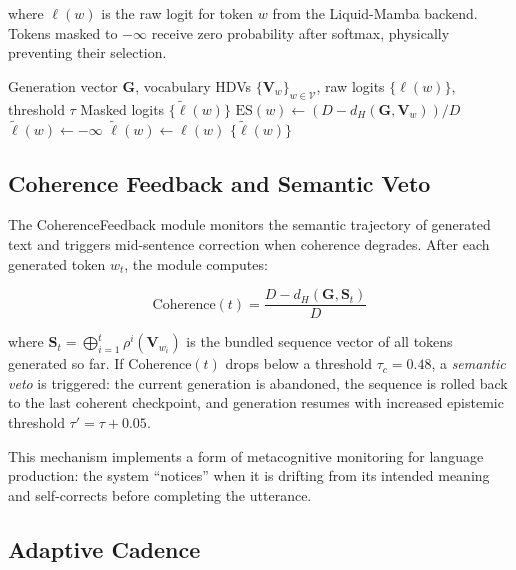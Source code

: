 \documentclass[12pt,a4paper]{article}
\begin{document}
where $\ell(w)$ is the raw logit for token $w$ from the Liquid-Mamba backend. Tokens masked to $-\infty$ receive zero probability after softmax, physically preventing their selection.

\begin{algorithm}[H]
\caption{Epistemic Gating for Token Generation}
\label{alg:epistemic-gate}
\begin{algorithmic}[1]
\REQUIRE Generation vector $\mathbf{G}$, vocabulary HDVs $\{\mathbf{V}_w\}_{w \in \mathcal{V}}$, raw logits $\{\ell(w)\}$, threshold $\tau$
\ENSURE Masked logits $\{\tilde{\ell}(w)\}$
    \STATE $\text{ES}(w) \leftarrow (D - d_H(\mathbf{G}, \mathbf{V}_w)) / D$
        \STATE $\tilde{\ell}(w) \leftarrow -\infty$
    \ELSE
        \STATE $\tilde{\ell}(w) \leftarrow \ell(w)$
    \ENDIF
\ENDFOR
\RETURN $\{\tilde{\ell}(w)\}$
\end{algorithmic}
\end{algorithm}

\subsection{Coherence Feedback and Semantic Veto}

The CoherenceFeedback module monitors the semantic trajectory of generated text and triggers mid-sentence correction when coherence degrades. After each generated token $w_t$, the module computes:

\begin{equation}
\text{Coherence}(t) = \frac{D - d_H(\mathbf{G}, \mathbf{S}_t)}{D}
\end{equation}

where $\mathbf{S}_t = \bigoplus_{i=1}^{t} \rho^i(\mathbf{V}_{w_i})$ is the bundled sequence vector of all tokens generated so far. If $\text{Coherence}(t)$ drops below a threshold $\tau_c = 0.48$, a \emph{semantic veto} is triggered: the current generation is abandoned, the sequence is rolled back to the last coherent checkpoint, and generation resumes with increased epistemic threshold $\tau' = \tau + 0.05$.

This mechanism implements a form of metacognitive monitoring for language production: the system ``notices'' when it is drifting from its intended meaning and self-corrects before completing the utterance.

\subsection{Adaptive Cadence}
\end{document}
